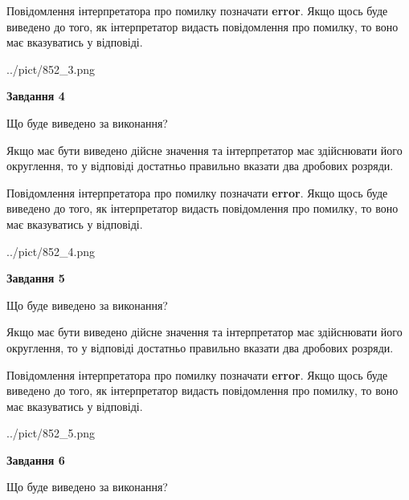 \documentclass[12pt, ukrainian]{article}
\begin{document}
{\begin {Large}
Повідомлення інтерпретатора про помилку позначати \textbf{error}.
Якщо щось буде виведено до того, як інтерпретатор видасть повідомлення про помилку, 
то воно має вказуватись у відповіді. \par

\begin{center}
	{../pict/852_3.png}
\end{center}
\newpage

{\begin {center}\textbf{Завдання 4}\end {center}}\par
Що буде виведено за виконання? \par

Якщо має бути виведено дійсне значення та інтерпретатор має здійснювати його округлення, 
то у відповіді достатньо правильно вказати два дробових розряди.

Повідомлення інтерпретатора про помилку позначати \textbf{error}.
Якщо щось буде виведено до того, як інтерпретатор видасть повідомлення про помилку, 
то воно має вказуватись у відповіді. \par

\begin{center}
	{../pict/852_4.png}
\end{center}
\newpage

{\begin {center}\textbf{Завдання 5}\end {center}}\par
Що буде виведено за виконання? \par

Якщо має бути виведено дійсне значення та інтерпретатор має здійснювати його округлення, 
то у відповіді достатньо правильно вказати два дробових розряди.

Повідомлення інтерпретатора про помилку позначати \textbf{error}.
Якщо щось буде виведено до того, як інтерпретатор видасть повідомлення про помилку, 
то воно має вказуватись у відповіді. \par

\begin{center}
	{../pict/852_5.png}
\end{center}
\newpage

{\begin {center}\textbf{Завдання 6}\end {center}}\par
Що буде виведено за виконання? \par


\end{Large}}
\end{document}
